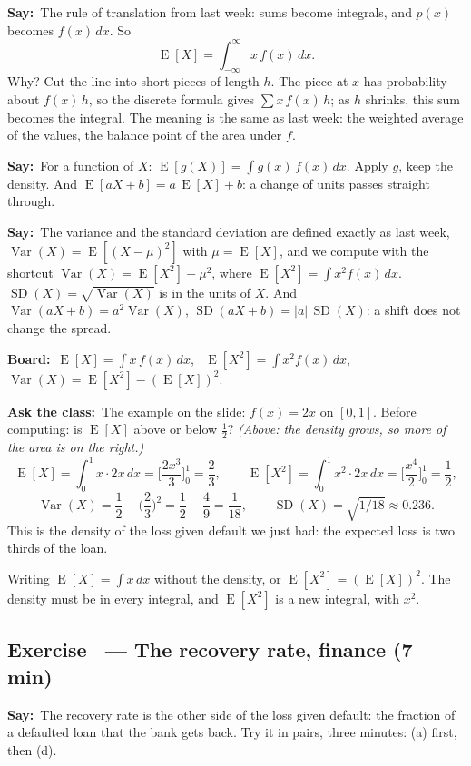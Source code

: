 \documentclass[11pt,a4paper,parskip=half]{scrartcl}
\renewcommand{\needspace}[1]{\Needspace{6\baselineskip}}
\newcommand{\E}{\operatorname{E}}
\newcommand{\Var}{\operatorname{Var}}
\newcommand{\SD}{\operatorname{SD}}
\newcommand{\say}{\textbf{\color{teal}Say:}\ }
\newcommand{\board}{\textbf{\color{gold}Board:}\ }
\newcommand{\ask}{\textbf{\color{navy}Ask the class:}\ }
\begin{document}
\say The rule of translation from last week: sums become integrals, and
$p(x)$ becomes $f(x)\,dx$. So
\[ \E[X]=\int_{-\infty}^{\infty}x\,f(x)\,dx. \]
Why? Cut the line into short pieces of length $h$. The piece at $x$ has
probability about $f(x)\,h$, so the discrete formula gives
$\sum x\,f(x)\,h$; as $h$ shrinks, this sum becomes the integral. The
meaning is the same as last week: the weighted average of the values, the
balance point of the area under $f$.

\say For a function of $X$: $\E[g(X)]=\int g(x)\,f(x)\,dx$. Apply $g$,
keep the density. And $\E[aX+b]=a\,\E[X]+b$: a change of units passes
straight through.

\say The variance and the standard deviation are defined exactly as last
week, $\Var(X)=\E[(X-\mu)^2]$ with $\mu=\E[X]$, and we compute with the
shortcut $\Var(X)=\E[X^2]-\mu^2$, where
$\E[X^2]=\int x^2f(x)\,dx$. $\SD(X)=\sqrt{\Var(X)}$ is in the units of
$X$. And $\Var(aX+b)=a^2\Var(X)$, $\SD(aX+b)=|a|\,\SD(X)$: a shift does
not change the spread.

\board $\E[X]=\int x\,f(x)\,dx$, \ $\E[X^2]=\int x^2f(x)\,dx$, \
$\Var(X)=\E[X^2]-(\E[X])^2$.

\ask The example on the slide: $f(x)=2x$ on $[0,1]$. Before computing: is
$\E[X]$ above or below $\tfrac12$? \emph{(Above: the density grows, so
more of the area is on the right.)}
\[ \E[X]=\int_0^1x\cdot2x\,dx=\Big[\frac{2x^3}{3}\Big]_0^1=\frac23,\qquad
	\E[X^2]=\int_0^1x^2\cdot2x\,dx=\Big[\frac{x^4}{2}\Big]_0^1=\frac12, \]
\[ \Var(X)=\frac12-\Big(\frac23\Big)^2=\frac12-\frac49=\frac1{18},\qquad
	\SD(X)=\sqrt{1/18}\approx0.236. \]
This is the density of the loss given default we just had: the expected
loss is two thirds of the loan.

\begin{mistake}
	Writing $\E[X]=\int x\,dx$ without the density, or
	$\E[X^2]=(\E[X])^2$. The density must be in every integral, and
	$\E[X^2]$ is a new integral, with $x^2$.
\end{mistake}

\needspace{0.25\textheight}
\subsection{Exercise~ --- The recovery rate, finance (7 min)}


\say The recovery rate is the other side of the loss given default: the
fraction of a defaulted loan that the bank gets back. Try it in pairs,
three minutes: (a) first, then (d).
\end{document}

